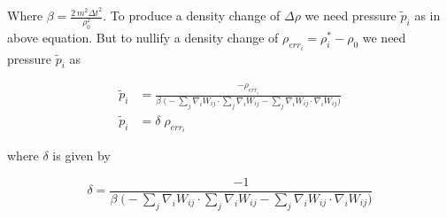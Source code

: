 Where $\beta=\frac{2\,m^2 \Delta t^2}{\rho_0^2}$. To produce a density change
of $\Delta \rho$ we need pressure $\widetilde{p}_i$ as in above equation. But to
nullify a density change of $\rho_{err_i} = \rho_i^* - \rho_0$ we need pressure
$\widetilde{p}_i$ as

\begin{align*}
  \widetilde{p}_i &= \frac{-\rho_{err_i}}{\beta \; \bigg(- \sum_j
                    \nabla_i W_{ij} \cdot \sum_j \nabla_i W_{ij} - \sum_j \nabla_i W_{ij} \cdot
                    \nabla_i W_{ij} \bigg)}\\
  \widetilde{p}_i &= \delta \; \rho_{err_i}
\end{align*}

where $\delta$ is given by

\begin{equation}
  \label{eq:pcisph_delta}
  \delta = \frac{-1}{\beta \; \bigg(- \sum_j \nabla_i
    W_{ij} \cdot \sum_j \nabla_i W_{ij} - \sum_j \nabla_i W_{ij} \cdot \nabla_i
    W_{ij} \bigg)}
\end{equation}

